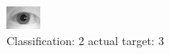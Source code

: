 \begin{figure}[h!]
\begin{center}
\includegraphics[width=0.60\columnwidth]{figures/ID1031_class_2_target_3.png}
\end{center}
\caption{ Classification: 2 actual target: 3}
\label{fig:ID1031_class_2_target_3}
\end{figure}
